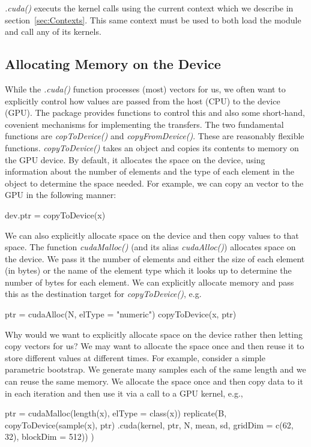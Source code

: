 \documentclass[article]{jss}
\def\R{\proglang{R}}
\def\Rpkg#1{\pkg{#1}}
\def\Rfunc#1{\textsl{#1()}}
\begin{document}
\Rfunc{.cuda} executs the kernel calls using the current context which
we describe in section~\ref{sec:Contexts}.  This same context must be
used to both load the module and call any of its kernels.

\subsection{Allocating Memory on the Device}
While the \Rfunc{.cuda} function processes (most) \R{} vectors for us,
we often want to explicitly control how values are passed from the
host (CPU) to the device (GPU). The \Rpkg{RCUDA} package provides
functions to control this and also some short-hand, covenient
mechanisms for implementing the transfers.  The two fundamental
functions are \Rfunc{copToDevice} and \Rfunc{copyFromDevice}.  These
are reasonably flexible functions.  \Rfunc{copyToDevice} takes an \R{}
object and copies its contents to memory on the GPU device.  By
default, it allocates the space on the device, using information about
the number of elements and the type of each element in the \R{} object
to determine the space needed.  For example, we can copy an \R{}
vector to the GPU in the following manner:
\begin{RCode}
dev.ptr = copyToDevice(x)
\end{RCode}

We can also explicitly allocate space on the device and then copy
values to that space.  The function \Rfunc{cudaMalloc} (and its alias
\Rfunc{cudaAlloc}) allocates space on the device.  We pass it the
number of elements and either the size of each element (in bytes) or
the name of the element type which it looks up to determine the number
of bytes for each element.  We can explicitly allocate memory and pass
this as the destination target for \Rfunc{copyToDevice}, e.g.
\begin{RCode}
ptr = cudaAlloc(N, elType = "numeric")
copyToDevice(x, ptr)
\end{RCode}

Why would we want to explicitly allocate space on the device rather
then letting \R{} copy vectors for us?  We may want to allocate the
space once and then reuse it to store different values at different
times. For example, consider a simple parametric bootstrap.  We
generate many samples each of the same length and we can reuse the
same memory.  We allocate the space once and then copy data to it
in each iteration and then use it via a call to a GPU kernel, e.g.,
\begin{RCode}
ptr = cudaMalloc(length(x), elType = class(x))
replicate(B, {
      copyToDevice(sample(x), ptr)
      .cuda(kernel, ptr, N, mean, sd, gridDim = c(62, 32), blockDim = 512))
})
\end{RCode}
\end{document}
